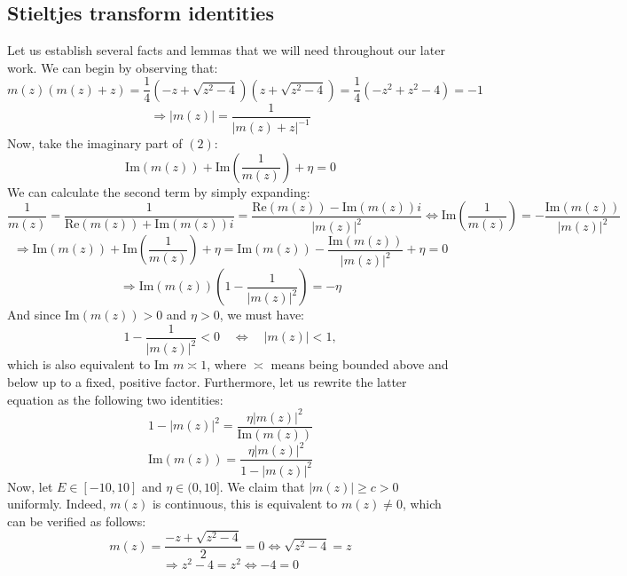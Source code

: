 \documentclass[11pt]{article}
\begin{document}
\subsection*{Stieltjes transform identities}
Let us establish several facts and lemmas that we will need throughout our later work. We can begin by observing that: $$m(z)(m(z)+z) = \frac{1}{4}(-z+\sqrt{z^2-4})(z+\sqrt{z^2-4})=\frac{1}{4}(-z^2+z^2-4)=-1$$
$$\Rightarrow |m(z)| = \frac{1}{|m(z)+z|^{-1}}$$
Now, take the imaginary part of $(2)$: $$\text{Im}(m(z)) + \text{Im}\left(\frac{1}{m(z)}\right)+\eta=0$$
We can calculate the second term by simply expanding: $$\frac{1}{m(z)} = \frac{1}{\text{Re}(m(z))+\text{Im}(m(z))i} = \frac{\text{Re}(m(z))-\text{Im}(m(z))i}{|m(z)|^2}\Leftrightarrow \text{Im}\left(\frac{1}{m(z)}\right) = -\frac{\text{Im}(m(z))}{|m(z)|^2}$$
$$\Rightarrow\text{Im}(m(z)) + \text{Im}\left(\frac{1}{m(z)}\right)+\eta=\text{Im}(m(z)) -\frac{\text{Im}(m(z))}{|m(z)|^2}+\eta=0$$
$$\Rightarrow \text{Im}(m(z))\left(1-\frac{1}{|m(z)|^2}\right)=-\eta$$
And since $\text{Im}(m(z))>0$ and $\eta>0$, we must have:
\begin{equation*}\label{2.1} 1-\frac{1}{|m(z)|^2}<0\quad \Leftrightarrow\quad |m(z)|<1, \tag{2.1}
\end{equation*}
which is also equivalent to $\text{Im }m \asymp 1$, where $\asymp$ means being bounded above and below up to a fixed, positive factor. Furthermore, let us rewrite the latter equation as the following two identities: \begin{equation*}\label{2.2}1-|m(z)|^2 = \frac{\eta|m(z)|^2}{\text{Im}(m(z))}
\tag{2.2}
\end{equation*}
\begin{equation*}\label{2.3}\text{Im}(m(z))= \frac{\eta|m(z)|^2}{1-|m(z)|^2 }
\tag{2.3}
\end{equation*}
Now, let $E\in [-10, 10]$ and $\eta\in (0, 10]$. We claim that $|m(z)|\geq c>0$ uniformly. Indeed, $m(z)$ is continuous, this is equivalent to $m(z)\neq 0$, which can be verified as follows: $$m(z) = \frac{-z+\sqrt{z^2-4}}{2}=0 \Leftrightarrow \sqrt{z^2-4}=z$$
$$\Rightarrow z^2-4=z^2\Leftrightarrow -4=0$$ 
\end{document}
